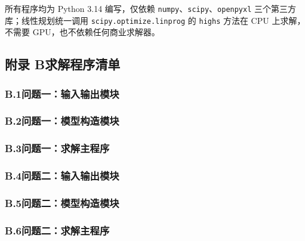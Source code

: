 所有程序均为 Python 3.14 编写，仅依赖 \texttt{numpy}、\texttt{scipy}、\texttt{openpyxl} 三个第三方库；线性规划统一调用 \texttt{scipy.optimize.linprog} 的 \texttt{highs} 方法在 CPU 上求解，不需要 GPU，也不依赖任何商业求解器。

\subsection*{附录 B\quad 求解程序清单}

\subsubsection*{B.1\quad 问题一：输入输出模块}



\subsubsection*{B.2\quad 问题一：模型构造模块}



\subsubsection*{B.3\quad 问题一：求解主程序}



\subsubsection*{B.4\quad 问题二：输入输出模块}



\subsubsection*{B.5\quad 问题二：模型构造模块}



\subsubsection*{B.6\quad 问题二：求解主程序}

